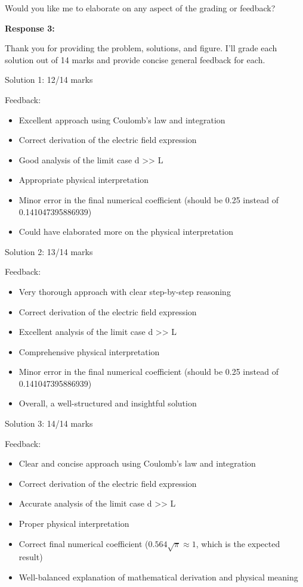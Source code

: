 \documentclass[a4paper,11pt]{article}
\begin{document}
Would you like me to elaborate on any aspect of the grading or feedback?

\textbf{Response 3:}

Thank you for providing the problem, solutions, and figure. I'll grade each solution out of 14 marks and provide concise general feedback for each.

Solution 1: 12/14 marks

Feedback:
\begin{itemize}
\item Excellent approach using Coulomb's law and integration
\item Correct derivation of the electric field expression
\item Good analysis of the limit case d >> L
\item Appropriate physical interpretation
\item Minor error in the final numerical coefficient (should be 0.25 instead of 0.141047395886939)
\item Could have elaborated more on the physical interpretation
\end{itemize}

Solution 2: 13/14 marks

Feedback:
\begin{itemize}
\item Very thorough approach with clear step-by-step reasoning
\item Correct derivation of the electric field expression
\item Excellent analysis of the limit case d >> L
\item Comprehensive physical interpretation
\item Minor error in the final numerical coefficient (should be 0.25 instead of 0.141047395886939)
\item Overall, a well-structured and insightful solution
\end{itemize}

Solution 3: 14/14 marks

Feedback:
\begin{itemize}
\item Clear and concise approach using Coulomb's law and integration
\item Correct derivation of the electric field expression
\item Accurate analysis of the limit case d >> L
\item Proper physical interpretation
\item Correct final numerical coefficient ($0.564\sqrt{\pi} \approx 1$, which is the expected result)
\item Well-balanced explanation of mathematical derivation and physical meaning
\end{itemize}
\end{document}
